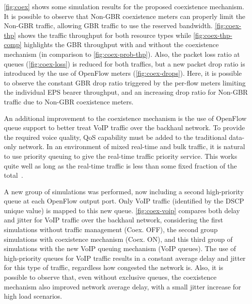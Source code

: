 \autoref{fig:coex} shows some simulation results for the proposed coexistence
mechanism. It is possible to observe that Non-\ac{GBR} coexistence meters can
properly limit the Non-\ac{GBR} traffic, allowing \ac{GBR} traffic to use the
reserved bandwidth. \autoref{fig:coex-thp} shows the traffic throughput for
both resource types while \autoref{fig:coex-thp-comp} highlights the \ac{GBR}
throughput with and without the coexistence mechanism (in comparison to
\autoref{fig:coex-prob-thp}). Also, the packet loss ratio at queues
(\autoref{fig:coex-loss}) is reduced for both traffics, but a new packet drop
ratio is introduced by the use of OpenFlow meters (\autoref{fig:coex-drops}).
Here, it is possible to observe the constant \ac{GBR} drop ratio triggered by
the per-flow meters limiting the individual \ac{EPS} bearer throughput, and an
increasing drop ratio for Non-\ac{GBR} traffic due to Non-\ac{GBR} coexistence
meters.

An additional improvement to the coexistence mechanism is the use of OpenFlow
queue support to better treat \ac{VoIP} traffic over the backhaul network. To
provide the required voice quality, \ac{QoS} capability must be added to the
traditional data-only network. In an environment of mixed real-time and bulk
traffic, it is natural to use priority queuing to give the real-time traffic
priority service. This works quite well as long as the real-time traffic is
less than some fixed fraction of the total~\cite{Dordal2015, rfc3246}.

A new group of simulations was performed, now including a second high-priority
queue at each OpenFlow output port. Only \ac{VoIP} traffic (identified by the
\ac{DSCP} unique value) is mapped to this new queue. \autoref{fig:coex-voip}
compares both delay and jitter for \ac{VoIP} traffic over the backhaul network,
considering the first simulations without traffic management (Coex. OFF), the
second group simulations with coexistence mechanism (Coex. ON), and this third
group of simulations with the new \ac{VoIP} queuing mechanism (VoIP queues).
The use of high-priority queues for \ac{VoIP} traffic results in a constant
average delay and jitter for this type of traffic, regardless how congested the
network is. Also, it is possible to observe that, even without exclusive
queues, the coexistence mechanism also improved network average delay, with a
small jitter increase for high load scenarios.

